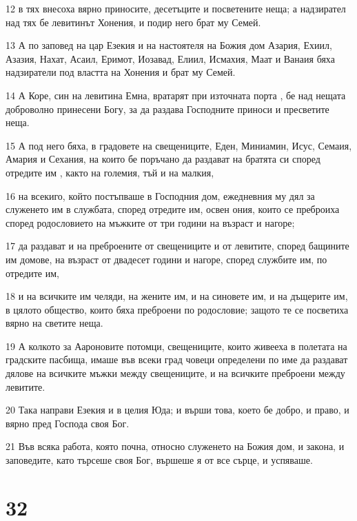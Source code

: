 \par 12 в тях внесоха вярно приносите, десетъците и посветените неща; а надзирател над тях бе левитинът Хонения, и подир него брат му Семей.
\par 13 А по заповед на цар Езекия и на настоятеля на Божия дом Азария, Ехиил, Азазия, Нахат, Асаил, Еримот, Иозавад, Елиил, Исмахия, Маат и Ванаия бяха надзиратели под властта на Хонения и брат му Семей.
\par 14 А Коре, син на левитина Емна, вратарят при източната порта , бе над нещата доброволно принесени Богу, за да раздава Господните приноси и пресветите неща.
\par 15 А под него бяха, в градовете на свещениците, Еден, Миниамин, Исус, Семаия, Амария и Сехания, на които бе поръчано да раздават на братята си според отредите им , както на големия, тъй и на малкия,
\par 16 на всекиго, който постъпваше в Господния дом, ежедневния му дял за служенето им в службата, според отредите им, освен ония, които се преброиха според родословието на мъжките от три години на възраст и нагоре;
\par 17 да раздават и на преброените от свещениците и от левитите, според бащините им домове, на възраст от двадесет години и нагоре, според службите им, по отредите им,
\par 18 и на всичките им челяди, на жените им, и на синовете им, и на дъщерите им, в цялото общество, които бяха преброени по родословие; защото те се посветиха вярно на светите неща.
\par 19 А колкото за Аароновите потомци, свещениците, които живееха в полетата на градските пасбища, имаше във всеки град човеци определени по име да раздават дялове на всичките мъжки между свещениците, и на всичките преброени между левитите.
\par 20 Така направи Езекия и в целия Юда; и върши това, което бе добро, и право, и вярно пред Господа своя Бог.
\par 21 Във всяка работа, която почна, относно служенето на Божия дом, и закона, и заповедите, като търсеше своя Бог, вършеше я от все сърце, и успяваше.

\chapter{32}

